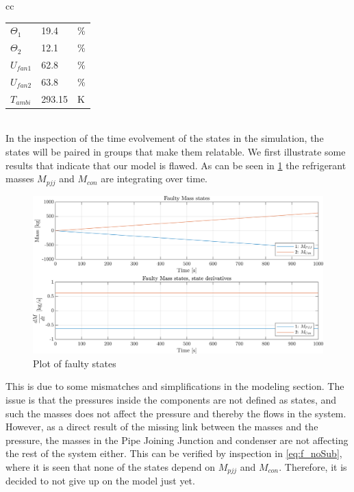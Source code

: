 \begin{tabular}{cc}
\begin{minipage}{.3\linewidth}
\begin{tabular}{@{}lll@{}}
			$\Theta_1$      & 19.4                                                               & \%            \\
			$\Theta_2$      & 12.1                                                               & \%            \\
			$U_{fan1}$      & 62.8                                                               & \%            \\
			$U_{fan2}$      & 63.8                                                               & \%            \\
			$T_{ambi}$        & 293.15                                                             & K             \\ \bottomrule
		\end{tabular}
	\end{minipage} 
\end{tabular}\\


In the inspection of the time evolvement of the states in the simulation, the states will be paired in groups that make them relatable. We first illustrate some results that indicate that our model is flawed. As can be seen in \cref{fig:non_lin_sim_faulty_Mass} the refrigerant masses $M_{pjj}$ and $M_{con}$ are integrating over time. 

\begin{figure}[h]
	\centering
	\includegraphics[width=1\textwidth]{Graphics/nonlin_sim_faulty_Mass.png}
	\caption{Plot of faulty states}
	\label{fig:non_lin_sim_faulty_Mass}
\end{figure}
This is due to some mismatches and simplifications in the modeling section. The issue is that the pressures inside the components are not defined as states, and such the masses does not affect the pressure and thereby the flows in the system. However, as a direct result of the missing link between the masses and the pressure, the masses in the Pipe Joining Junction and condenser are not affecting the rest of the system either. This can be verified by inspection in \cref{eq:f_noSub}, where it is seen that none of the states depend on $M_{pjj}$ and $M_{con}$. Therefore, it is decided to not give up on the model just yet. \\

